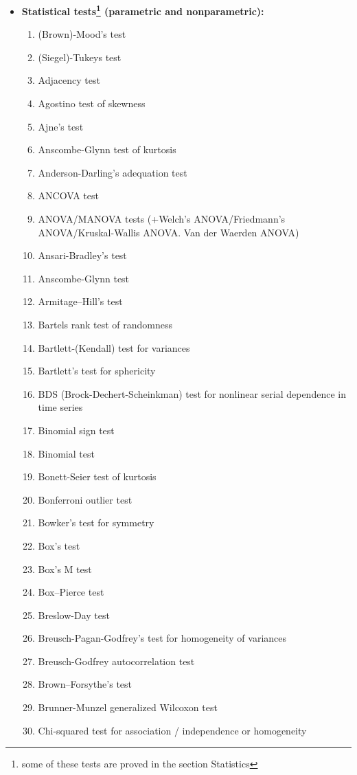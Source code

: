 \begin{itemize}
		\item \textbf{Statistical tests\footnote{some of these tests are proved in the section Statistics} (parametric and nonparametric):}
		\begin{multicols}{3}
		\begin{enumerate}
			\item (Brown)-Mood's test
			\item (Siegel)-Tukeys test
			\item Adjacency test
			\item Agostino test of skewness
			\item Ajne's test
			\item Anscombe-Glynn test of kurtosis
			\item Anderson-Darling's adequation test
			\item ANCOVA test
			\item ANOVA/MANOVA tests (+Welch's ANOVA/Friedmann's ANOVA/Kruskal-Wallis ANOVA. Van der Waerden ANOVA)
			\item Ansari-Bradley's test
			\item Anscombe-Glynn test
			\item Armitage–Hill's test
			\item Bartels rank test of randomness
			\item Bartlett-(Kendall) test for variances
			\item Bartlett's test for sphericity
			\item BDS (Brock-Dechert-Scheinkman) test for nonlinear serial dependence in time series
			\item Binomial sign test
			\item Binomial test 
			\item Bonett-Seier test of kurtosis
			\item Bonferroni outlier test
			\item Bowker's test for symmetry
			\item Box's test
			\item Box's M test
			\item Box–Pierce test
			\item Breslow-Day test
			\item Breusch-Pagan-Godfrey's test for homogeneity of variances
			\item Breusch-Godfrey autocorrelation test
			\item Brown–Forsythe's test
			\item Brunner-Munzel generalized Wilcoxon test
			\item Chi-squared test for association / independence or homogeneity

\end{enumerate}
\end{multicols}
\end{itemize}
